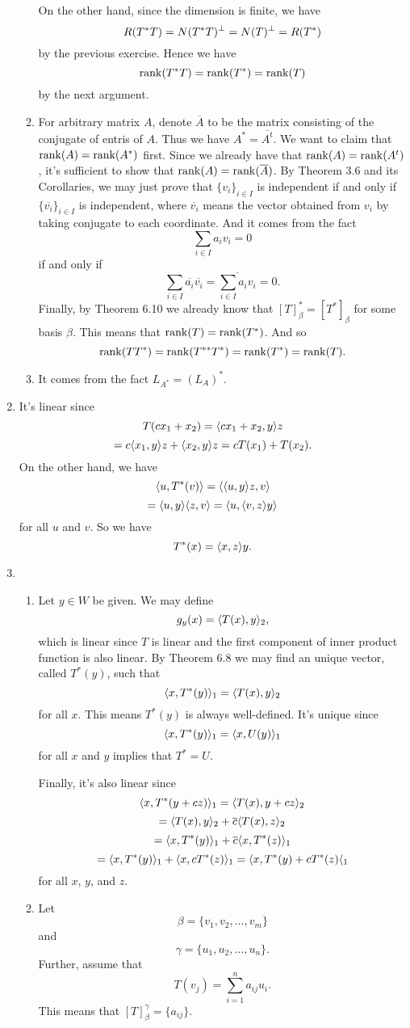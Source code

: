 \begin{enumerate}
\begin{enumerate}
On the other hand, since the dimension is finite, we have 
\[R(T^*T)=N(T^*T)^{\perp} =N(T)^{\perp} =R(T^*)\]
by the previous exercise. Hence we have  
\[\operatorname{rank}(T^*T)=\operatorname{rank}(T^*)=\operatorname{rank}(T)\]
by the next argument.
\item For arbitrary matrix $A$, denote $\overline{A}$ to be the matrix consisting of the conjugate of entris of $A$. Thus we have $A^*=\overline{A^t}$. We want to claim that $\operatorname{rank}(A)=\operatorname{rank}(A^*)$ first. Since we already have that $\operatorname{rank}(A)=\operatorname{rank}(A^t)$, it's sufficient to show that $\operatorname{rank}(A)=\operatorname{rank}(\overline{A})$. By Theorem 3.6 and its Corollaries, we may just prove that $\{v_i\}_{i\in I}$ is independent if and only if $\{\overline{v_i}\}_{i\in I}$ is independent, where $\overline{v_i}$ means the vector obtained from $v_i$ by taking conjugate to each coordinate. And it comes from the fact 
\[\sum_{i\in I}a_iv_i=0\]
if and only if 
\[\sum_{i\in I}\overline{a_i}\overline{v_i}=\overline{\sum_{i\in I}a_iv_i}=0.\]
Finally, by Theorem 6.10 we already know that $[T]_{\beta}^*=[T^*]_{\beta}$ for some basis $\beta$. This means that $\operatorname{rank}(T)=\operatorname{rank}(T^*)$. And so 
\[\operatorname{rank}(TT^*)=\operatorname{rank}(T^{**}T^*)=\operatorname{rank}(T^*)=\operatorname{rank}(T).\]
\item It comes from the fact $L_{A^*}=(L_A)^*$.
\end{enumerate}
\item It's linear since 
\[T(cx_1+x_2)=\langle cx_1+x_2,y\rangle z\]
\[=c\langle x_1,y\rangle z+\langle x_2,y\rangle z=cT(x_1)+T(x_2).\]
On the other hand, we have 
\[\langle u,T^*(v)\rangle =\langle \langle u,y\rangle z,v\rangle \]
\[=\langle u,y\rangle \langle z,v\rangle =\langle u,\langle v,z\rangle y\rangle \]
for all $u$ and $v$. So we have 
\[T^*(x)=\langle x,z\rangle y.\]
\item \begin{enumerate}
\item Let $y\in W$ be given. We may define 
\[g_y(x) =\langle T(x),y\rangle_2,\] 
which is linear since $T$ is linear and the first component of inner product function is also linear. By Theorem 6.8 we may find an unique vector, called $T^*(y)$, such that 
\[\langle x,T^*(y)\rangle_1 =\langle T(x),y\rangle_2\]
for all $x$. This means $T^*(y)$ is always well-defined. It's unique since 
\[\langle x,T^*(y)\rangle_1 =\langle x,U(y)\rangle_1\]
for all $x$ and $y$ implies that $T^*=U$.

Finally, it's also linear since 
\[\langle x,T^*(y+cz)\rangle_1 =\langle T(x),y+cz\rangle_2 \]
\[=\langle T(x),y\rangle_2 +\overline{c}\langle T(x),z\rangle_2 \]
\[=\langle x,T^*(y)\rangle_1 +\overline{c}\langle x,T^*(z)\rangle_1 \]
\[=\langle x,T^*(y)\rangle_1 +\langle x,cT^*(z)\rangle_1 =\langle x,T^*(y)+cT^*(z)\langle_1 \]
for all $x$, $y$, and $z$.
\item Let 
\[\beta =\{v_1,v_2,\ldots ,v_m\}\]
and
\[\gamma =\{u_1,u_2,\ldots ,u_n\}.\]
Further, assume that 
\[T(v_j)=\sum_{i=1}^n{a_{ij}u_i}.\]
This means that $[T]_{\beta}^{\gamma}=\{a_{ij}\}$. 


\end{enumerate}
\end{enumerate}
